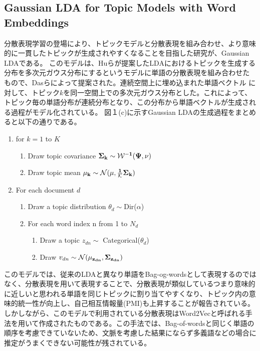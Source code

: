 \documentclass[uplatex]{jsarticle}
\begin{document}
\subsection{Gaussian LDA for Topic Models with Word Embeddings}
分散表現学習の登場により、トピックモデルと分散表現を組み合わせ、より意味的に一貫したトピックが生成されやすくなることを目指した研究が、Gaussian LDA\cite{Gaussian LDA}である。
このモデルは、Huら\cite{Gaussian}が提案したLDAにおけるトピックを生成する分布を多次元ガウス分布にするというモデルに単語の分散表現を組み合わせたもので、Dasら\cite{Gaussian LDA}によって提案された。連続空間上に埋め込まれた単語ベクトル
に対して、トピック$k$を同一空間上での多次元ガウス分布とした。これによって、トピック毎の単語分布が連続分布となり、この分布から単語ベクトルが生成される過程がモデル化されている。
図１(c)に示すGaussian LDAの生成過程をまとめると以下の通りである。

\begin{enumerate}
    \item for $k=1$ to $K$
          \begin{enumerate}
              \item Draw topic covariance $\bf{\Sigma_{k}} \sim \mathcal{W}^{-1}(\Psi, \nu)$
              \item Draw topic mean $\bf{\mu_{k}} \sim \mathcal{N}(\bf{\mu}, \frac{1}{\mathcal{K}}\bf{\Sigma_{k}})$
          \end{enumerate}
    \item For each document $d$
          \begin{enumerate}
              \item Draw a topic distribution $\theta_{d} \sim $Dir($\alpha$)
              \item For each word index n from 1 to $N_{d}$
                    \begin{enumerate}
                        \item Draw a topic $z_{dn} \sim$ Categorical($\theta_{d}$)
                        \item Draw $v_{dn} \sim \mathcal{N}(\bf{\mu_{z_{dn}}}, \bf{\Sigma_{z_{dn}}})$
                    \end{enumerate}
          \end{enumerate}
\end{enumerate}

このモデルでは、従来のLDAと異なり単語をBag-og-wordsとして表現するのではなく、分散表現を用いて表現することで、分散表現が類似しているつまり意味的に近しいと思われる単語を同じトピックに割り当てやすくなり、トピック内の意味的統一性が向上し、自己相互情報量(PMI)も上昇することが報告されている。
しかしながら、このモデルで利用されている分散表現はWord2Vec\cite{Word2Vec}と呼ばれる手法を用いて作成されたものである。この手法では、Bag-of-wordsと同じく単語の順序を考慮できていないため、文脈を考慮した結果にならず多義語などの場合に推定がうまくできない可能性が残されている。
\end{document}
